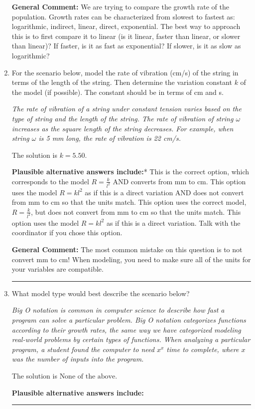 \documentclass{extbook}[14pt]
\newcommand{\litem}[1]{\item #1

\rule{\textwidth}{0.4pt}}
\begin{document}
\begin{enumerate}
{\textbf{General Comment:} We are trying to compare the growth rate of the population. Growth rates can be characterized from slowest to fastest as: logarithmic, indirect, linear, direct, exponential. The best way to approach this is to first compare it to linear (is it linear, faster than linear, or slower than linear)? If faster, is it as fast as exponential? If slower, is it as slow as logarithmic?
}
\litem{
For the scenario below, model the rate of vibration (cm/s) of the string in terms of the length of the string. Then determine the variation constant $k$ of the model (if possible). The constant should be in terms of cm and s.

\begin{center}
    \textit{ The rate of vibration of a string under constant tension varies based on the type of string and the length of the string. The rate of vibration of string $\omega$ increases as the square length of the string decreases. For example, when string $\omega$ is 5 mm long, the rate of vibration is 22 cm/s. }
\end{center}
The solution is \( k = 5.50 \).\begin{enumerate}[label=\Alph*.]
\textbf{Plausible alternative answers include:}* This is the correct option, which corresponds to the model $R = \frac{k}{l^{2}}$ AND converts from mm to cm.
This option uses the model $R = kl^{2}$ as if this is a direct variation AND does not convert from mm to cm so that the units match.
This option uses the correct model, $R = \frac{k}{l^{2}}$, but does not convert from mm to cm so that the units match.
This option uses the model $R = kl^{2}$ as if this is a direct variation.
Talk with the coordinator if you chose this option.
\end{enumerate}

\textbf{General Comment:} The most common mistake on this question is to not convert mm to cm! When modeling, you need to make sure all of the units for your variables are compatible.
}
\litem{
What model type would best describe the scenario below?

\begin{center}
    \textit{ Big O notation is common in computer science to describe how fast a program can solve a particular problem. Big O notation categorizes functions according to their growth rates, the same way we have categorized modeling real-world problems by certain types of functions. When analyzing a particular program, a student found the computer to need $x^x$ time to complete, where $x$ was the number of inputs into the program. }
\end{center}
The solution is \( \text{None of the above} \).\begin{enumerate}[label=\Alph*.]
\textbf{Plausible alternative answers include:}




\end{enumerate}}
\end{enumerate}
\end{document}
